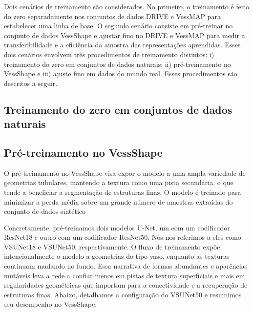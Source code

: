 \documentclass[%
reprint,
nofootinbib,
 amsmath,amssymb,
aps,
superscriptaddress,
showkeys,
longbibliography
]{revtex4-1}
\begin{document}
Dois cenários de treinamento são considerados. No primeiro, o treinamento é feito do zero separadamente nos conjuntos de dados DRIVE e VessMAP para estabelecer uma linha de base. O segundo cenário consiste em pré-treinar no conjunto de dados VessShape e ajustar fino no DRIVE e VessMAP para medir a transferibilidade e a eficiência da amostra das representações aprendidas. Esses dois cenários envolvem três procedimentos de treinamento distintos: i) treinamento do zero em conjuntos de dados naturais; ii) pré-treinamento no VessShape e iii) ajuste fino em dados do mundo real. Esses procedimentos são descritos a seguir.

\subsection{Treinamento do zero em conjuntos de dados naturais}

\subsection{Pré-treinamento no VessShape}

O pré-treinamento no VessShape visa expor o modelo a uma ampla variedade de geometrias tubulares, mantendo a textura como uma pista secundária, o que tende a beneficiar a segmentação de estruturas finas. O modelo é treinado para minimizar a perda média sobre um grande número de amostras extraídas do conjunto de dados sintético

Concretamente, pré-treinamos dois modelos U-Net, um com um codificador ResNet18 e outro com um codificador ResNet50. Nós nos referimos a eles como VSUNet18 e VSUNet50, respectivamente. O fluxo de treinamento expõe intencionalmente o modelo a geometrias do tipo vaso, enquanto as texturas continuam mudando no fundo. Essa narrativa de formas abundantes e aparências mutáveis ​​leva a rede a confiar menos em pistas de textura superficiais e mais em regularidades geométricas que importam para a conectividade e a recuperação de estruturas finas. Abaixo, detalhamos a configuração do VSUNet50 e resumimos seu desempenho no VessShape.
\end{document}
